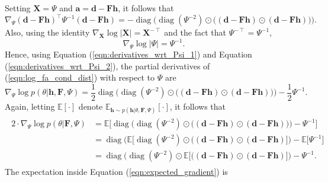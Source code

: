 \documentclass[msc,deptreport.inf]{infthesis} %
\newcommand{\matr}[1]{\mathbf{#1}}
\newcommand{\E}{\mathbb E}
\newcommand{\diag}{\mathop{\mathrm{diag}}}
\begin{document}
Setting $\matr{X} = \Psi$ and $\matr{a} = \matr{d}- \matr{Fh}$, it follows that
\begin{equation}\label{eqn:derivatives_wrt_Psi_1}
	\nabla_\Psi (\matr{d} - \matr{Fh})^\intercal \Psi^{-1} (\matr{d}- \matr{Fh}) 
	= -\diag\Big(\diag(\Psi^{-2}) \odot \big((\matr{d} - \matr{Fh}) \odot (\matr{d} - \matr{Fh})\big)\Big).
\end{equation}
Also, using the identity $\nabla_\matr{X} \log |\matr{X}| = \matr{X}^{-\intercal}$ and the fact that $\Psi^{-\intercal} = \Psi^{-1}$, 
\begin{equation}\label{eqn:derivatives_wrt_Psi_2}
	\nabla_\Psi \log |\Psi|
	= \Psi^{-1}.
\end{equation}
Hence, using Equation (\ref{eqn:derivatives_wrt_Psi_1}) and Equation (\ref{eqn:derivatives_wrt_Psi_2}), the partial derivatives of (\ref{eqn:log_fa_cond_dist}) with respect to $\Psi$ are
\begin{equation}
	\nabla_{\Psi} \log p(\theta | \matr{h}, \matr{F}, \Psi)
	= \frac{1}{2} \diag\Big(\diag(\Psi^{-2}) \odot \big((\matr{d} - \matr{Fh}) \odot (\matr{d} - \matr{Fh})\big)\Big) - \frac{1}{2}\Psi^{-1}.
\end{equation}
Again, letting $\E[\cdot]$ denote $\E_{\matr{h} \sim p(\matr{h} | \theta, \matr{F}, \Psi)}[\cdot]$, it follows that
\begin{align}\label{eqn:expected_gradient}
\begin{split}
	2 \cdot \nabla_{\Psi} \log p(\theta | \matr{F}, \Psi) 
	& = \E \Big[ \diag\Big(\diag(\Psi^{-2}) \odot \big((\matr{d} - \matr{Fh}) \odot (\matr{d} - \matr{Fh})\big)\Big) - \Psi^{-1} \Big] \\
	& = \diag\Big(\E \big[\diag(\Psi^{-2}) \odot \big((\matr{d} - \matr{Fh}) \odot (\matr{d} - \matr{Fh})\big]\Big) - \E \big[ \Psi^{-1} \big] \\
	& = \diag\Big(\diag(\Psi^{-2}) \odot \E \big[\big((\matr{d} - \matr{Fh}) \odot (\matr{d} - \matr{Fh})\big]\Big) - \Psi^{-1}.
\end{split}
\end{align} 
The expectation inside Equation (\ref{eqn:expected_gradient}) is
\end{document}
